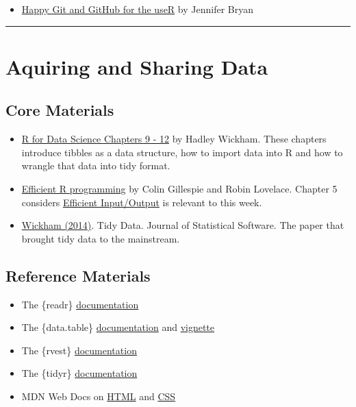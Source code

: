 \documentclass[
  12pt,
]{book}
\providecommand{\tightlist}{%
  \setlength{\itemsep}{0pt}\setlength{\parskip}{0pt}}
\begin{document}
\begin{itemize}
\tightlist
\item
  \href{https://happygitwithr.com/}{Happy Git and GitHub for the useR} by Jennifer Bryan
\end{itemize}

\begin{center}\rule{0.5\linewidth}{0.5pt}\end{center}

\hypertarget{data-reading}{%
\section{Aquiring and Sharing Data}\label{data-reading}}

\hypertarget{core-materials-1}{%
\subsection*{Core Materials}\label{core-materials-1}}

\begin{itemize}
\item
  \href{https://r4ds.had.co.nz/tidy-data.html}{R for Data Science Chapters 9 - 12} by Hadley Wickham. These chapters introduce tibbles as a data structure, how to import data into R and how to wrangle that data into tidy format.
\item
  \href{https://csgillespie.github.io/efficientR/}{Efficient R programming} by Colin Gillespie and Robin Lovelace. Chapter 5 considers \href{https://csgillespie.github.io/efficientR/input-output.html}{Efficient Input/Output} is relevant to this week.
\item
  \href{https://vita.had.co.nz/papers/tidy-data.html}{Wickham (2014)}. Tidy Data. Journal of Statistical Software. The paper that brought tidy data to the mainstream.
\end{itemize}

\hypertarget{reference-materials-1}{%
\subsection*{Reference Materials}\label{reference-materials-1}}

\begin{itemize}
\item
  The \{readr\} \href{https://readr.tidyverse.org/}{documentation}
\item
  The \{data.table\} \href{https://cran.r-project.org/web/packages/data.table/data.table.pdf}{documentation} and \href{https://cran.r-project.org/web/packages/data.table/vignettes/datatable-intro.html}{vignette}
\item
  The \{rvest\} \href{https://rvest.tidyverse.org/}{documentation}
\item
  The \{tidyr\} \href{https://tidyr.tidyverse.org/}{documentation}
\item
  MDN Web Docs on \href{https://developer.mozilla.org/en-US/docs/Web/HTML}{HTML} and \href{https://developer.mozilla.org/en-US/docs/Web/CSS}{CSS}
\end{itemize}
\end{document}
